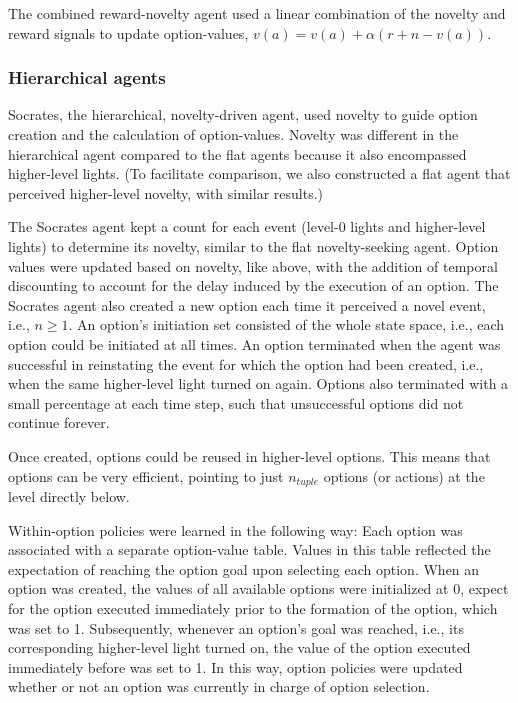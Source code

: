 \documentclass{article}
\begin{document}
The combined reward-novelty agent used a linear combination of the novelty and reward signals to update option-values, $v(a) = v(a) + \alpha (r + n - v(a))$. 


\subsubsection{Hierarchical agents}

Socrates, the hierarchical, novelty-driven agent, used novelty to guide option creation and the calculation of option-values. Novelty was different in the hierarchical agent compared to the flat agents because it also encompassed higher-level lights. (To facilitate comparison, we also constructed a flat agent that perceived higher-level novelty, with similar results.)

The Socrates agent kept a count for each event (level-0 lights and higher-level lights) to determine its novelty, similar to the flat novelty-seeking agent. Option values were updated based on novelty, like above, with the addition of temporal discounting to account for the delay induced by the execution of an option. The Socrates agent also created a new option each time it perceived a novel event, i.e., $n \geq 1$. An option's initiation set consisted of the whole state space, i.e., each option could be initiated at all times. An option terminated when the agent was successful in reinstating the event for which the option had been created, i.e., when the same higher-level light turned on again. Options also terminated with a small percentage at each time step, such that unsuccessful options did not continue forever. 

Once created, options could be reused in higher-level options. This means that options can be very efficient, pointing to just $n_{tuple}$ options (or actions) at the level directly below.

Within-option policies were learned in the following way: Each option was associated with a separate option-value table. Values in this table reflected the expectation of reaching the option goal upon selecting each option. When an option was created, the values of all available options were initialized at 0, expect for the option executed immediately prior to the formation of the option, which was set to 1. Subsequently, whenever an option's goal was reached, i.e., its corresponding higher-level light turned on, the value of the option executed immediately before was set to 1. In this way, option policies were updated whether or not an option was currently in charge of option selection. 
\end{document}
